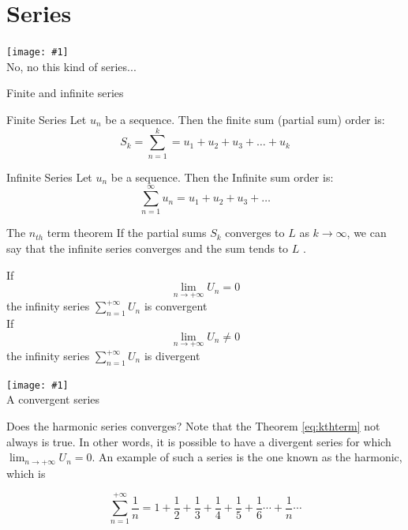 \documentclass[newPxFont]{beamer}
\newcommand \imageFrame[2]{
\begingroup
\begin{frame}
  \begin{center}
\texttt{[image: \#1]}\\
\Large #2
    \end{center}
\end{frame}
\endgroup
}
\begin{document}
\section{Series}
\imageFrame{netflix}{No, no this kind of series...}
\begin{frame}{Finite and infinite series}
  \begin{block}{Finite Series}
    Let ${u_n}$ be a sequence. Then the finite sum (partial sum) order is:\\
    \begin{equation}
        S_k=\sum_{n=1}^{k}=u_1+u_2+u_3+\hdots+u_k
    \end{equation}
  \end{block}
  \pause
  \begin{block}{Infinite Series}
    Let ${u_n}$ be a sequence. Then the Infinite sum order is:\\
    \begin{equation}
        \sum_{n=1}^\infty u_n=u_1+u_2+u_3+\hdots
    \end{equation}
  \end{block}
\end{frame}
\begin{frame}{The $n_{th}$ term theorem}
If the partial sums $S_k$ converges to $L$ as $k\longrightarrow \infty$,
  we can say that the infinite series converges and the sum
  tends to $L$ \cite{Math242017}.

\begin{theorem}
If
\begin{equation}
  \lim_{n \to +\infty} U_n=0\label{eq:kthterm}
\end{equation}
the infinity series $\sum_{n=1}^{+\infty} U_n$ is \alert{convergent}
\vspace{0.2in}\\
If
\begin{equation}
  \lim_{n \to +\infty} U_n\neq0
\end{equation}
the infinity series $\sum_{n=1}^{+\infty} U_n$ is \alert{divergent}
\end{theorem}
\end{frame}
\imageFrame{L}{A convergent series}
\begin{frame}{Does the harmonic series converges?}
Note that the Theorem \eqref{eq:kthterm} not always is true. In other words, it is possible to have a \alert{divergent} series for which $\lim_{n \to +\infty} U_n=0$. An example of such a series is the one known as the harmonic, which is

\pause
\begin{equation}
  \sum_{n=1}^{+\infty} \frac{1}{n}=1+\frac{1}{2}+\frac{1}{3}+\frac{1}{4}+\frac{1}{5}+\frac{1}{6}\cdots+\frac{1}{n}\cdots
\end{equation}
\end{frame}
\end{document}
